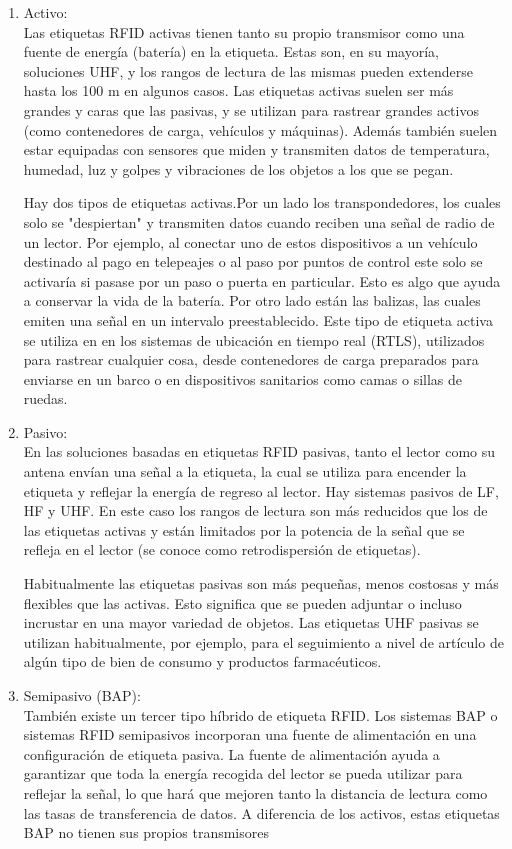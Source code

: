 \documentclass[12pt,a4paper,onecolumn,oneside]{report}
\begin{document}
\begin{enumerate}

\item Activo:\\
Las etiquetas RFID activas tienen tanto su propio transmisor como una fuente de energía (batería) en la etiqueta. Estas son, en su mayoría, soluciones UHF, y los rangos de lectura de las mismas pueden extenderse hasta los 100 m en algunos casos. Las etiquetas activas suelen ser más grandes y caras que las pasivas, y se utilizan para rastrear grandes activos (como contenedores de carga, vehículos y máquinas). Además también suelen estar equipadas con sensores que miden y transmiten datos de temperatura, humedad, luz y golpes y vibraciones de los objetos a los que se pegan.

Hay dos tipos de etiquetas activas.Por un lado los transpondedores, los cuales solo se "despiertan" y transmiten datos cuando reciben una señal de radio de un lector. Por ejemplo, al conectar uno de estos dispositivos a un vehículo destinado al pago en telepeajes o al paso por puntos de control este solo se activaría si pasase por un paso o puerta en particular. Esto es algo que ayuda a conservar la vida de la batería. Por otro lado están las balizas, las cuales emiten una señal en un intervalo preestablecido. Este tipo de etiqueta activa se utiliza en en los sistemas de ubicación en tiempo real (RTLS), utilizados para rastrear cualquier cosa, desde contenedores de carga preparados para enviarse en un barco o en dispositivos sanitarios como camas o sillas de ruedas.

\item Pasivo:\\
En las soluciones basadas en etiquetas RFID pasivas, tanto el lector como su antena envían una señal a la etiqueta, la cual se utiliza para encender la etiqueta y reflejar la energía de regreso al lector. Hay sistemas pasivos de LF, HF y UHF. En este caso los rangos de lectura son más reducidos que los de las etiquetas activas y están limitados por la potencia de la señal que se refleja en el lector (se conoce como retrodispersión de etiquetas).

Habitualmente las etiquetas pasivas son más pequeñas, menos costosas y más flexibles que las activas. Esto significa que se pueden adjuntar o incluso incrustar en una mayor variedad de objetos. Las etiquetas UHF pasivas se utilizan habitualmente, por ejemplo, para el seguimiento a nivel de artículo de algún tipo de bien de consumo y productos farmacéuticos.

\item Semipasivo (BAP):\\
También existe un tercer tipo híbrido de etiqueta RFID. Los sistemas BAP o sistemas RFID semipasivos incorporan una fuente de alimentación en una configuración de etiqueta pasiva. La fuente de alimentación ayuda a garantizar que toda la energía recogida del lector se pueda utilizar para reflejar la señal, lo que hará que mejoren tanto la distancia de lectura como las tasas de transferencia de datos. A diferencia de los activos, estas etiquetas BAP no tienen sus propios transmisores

\end{enumerate}
\end{document}
